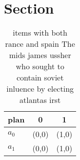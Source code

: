 \documentclass[a4paper]{article}
\begin{document}
\section{Section}

\begin{table}
\begin{adjustbox}{width=0.8\columnwidth}
\begin{tabular}{|l|l|l|}
\hline
\textbf{plan} & \multicolumn{1}{c|}{\textbf{0}} & \multicolumn{1}{c|}{\textbf{1}} \\ \hline
\textbf{$a_0$}  & (0,0) & (1,0) \\ \hline
\textbf{$a_1$}  & (0,0) & (1,0) \\ \hline
\end{tabular}
\end{adjustbox}
\caption{ items with both rance and spain The mids james ussher who sought to contain soviet inluence by electing atlantas irst 
}
\end{table}
\end{document}
